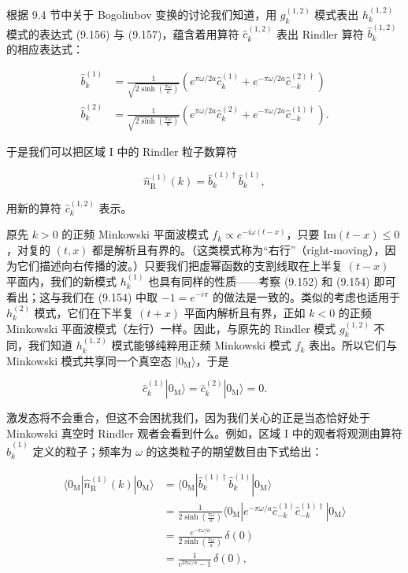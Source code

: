 根据 9.4 节中关于 Bogoliubov 变换的讨论我们知道，用 $g_{k}^{(1,2)}$ 模式表出 $h_{k}^{(1,2)}$ 模式的表达式 (9.156) 与 (9.157)，蕴含着用算符 $\hat{c}_{k}^{(1,2)}$ 表出 Rindler 算符 $\hat{b}_{k}^{(1,2)}$ 的相应表达式：

\begin{align*}
\hat{b}_{k}^{(1)} &= \frac{1}{\sqrt{2\sinh\left(\frac{\pi\omega}{a}\right)}}\left(e^{\pi\omega/2a}\hat{c}_{k}^{(1)} + e^{-\pi\omega/2a}\hat{c}_{-k}^{(2)\dagger}\right) \\
\hat{b}_{k}^{(2)} &= \frac{1}{\sqrt{2\sinh\left(\frac{\pi\omega}{a}\right)}}\left(e^{\pi\omega/2a}\hat{c}_{k}^{(2)} + e^{-\pi\omega/2a}\hat{c}_{-k}^{(1)\dagger}\right).
\tag{9.160}
\end{align*}

于是我们可以把区域 I 中的 Rindler 粒子数算符

\begin{equation*}
\hat{n}_{\mathrm{R}}^{(1)}(k) = \hat{b}_{k}^{(1)\dagger}\hat{b}_{k}^{(1)},
\tag{9.161}
\end{equation*}

用新的算符 $\hat{c}_{k}^{(1,2)}$ 表示。

原先 $k>0$ 的正频 Minkowski 平面波模式 $f_k\propto e^{-i\omega(t-x)}$，只要 $\mathrm{Im}(t-x)\leq 0$，对复的 $(t,x)$ 都是解析且有界的。（这类模式称为“右行”（right-moving），因为它们描述向右传播的波。）只要我们把虚幂函数的支割线取在上半复 $(t-x)$ 平面内，我们的新模式 $h_{k}^{(1)}$ 也具有同样的性质——考察 (9.152) 和 (9.154) 即可看出；这与我们在 (9.154) 中取 $-1=e^{-i\pi}$ 的做法是一致的。类似的考虑也适用于 $h_{k}^{(2)}$ 模式，它们在下半复 $(t+x)$ 平面内解析且有界，正如 $k<0$ 的正频 Minkowski 平面波模式（左行）一样。因此，与原先的 Rindler 模式 $g_{k}^{(1,2)}$ 不同，我们知道 $h_{k}^{(1,2)}$ 模式能够纯粹用正频 Minkowski 模式 $f_k$ 表出。所以它们与 Minkowski 模式共享同一个真空态 $|0_{\mathrm{M}}\rangle$，于是

\begin{equation*}
\hat{c}_{k}^{(1)}|0_{\mathrm{M}}\rangle = \hat{c}_{k}^{(2)}|0_{\mathrm{M}}\rangle = 0.
\tag{9.162}
\end{equation*}

激发态将不会重合，但这不会困扰我们，因为我们关心的正是当态恰好处于 Minkowski 真空时 Rindler 观者会看到什么。例如，区域 I 中的观者将观测由算符 $\hat{b}_{k}^{(1)}$ 定义的粒子；频率为 $\omega$ 的这类粒子的期望数目由下式给出：

\begin{align*}
\langle 0_{\mathrm{M}}|\hat{n}_{\mathrm{R}}^{(1)}(k)|0_{\mathrm{M}}\rangle &= \langle 0_{\mathrm{M}}|\hat{b}_{k}^{(1)\dagger}\hat{b}_{k}^{(1)}|0_{\mathrm{M}}\rangle \\
&= \frac{1}{2\sinh\left(\frac{\pi\omega}{a}\right)}\langle 0_{\mathrm{M}}|e^{-\pi\omega/a}\hat{c}_{-k}^{(1)}\hat{c}_{-k}^{(1)\dagger}|0_{\mathrm{M}}\rangle \\
&= \frac{e^{-\pi\omega/a}}{2\sinh\left(\frac{\pi\omega}{a}\right)}\,\delta(0) \\
&= \frac{1}{e^{2\pi\omega/a} - 1}\,\delta(0),
\tag{9.163}
\end{align*}


